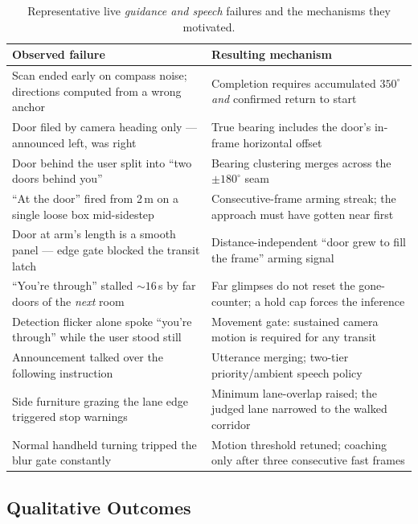 \begin{table}[!htbp]
\centering
\caption[Live guidance and speech failures]{Representative live \emph{guidance and
speech} failures and the mechanisms they motivated.}
\label{tab:failures_guidance}
\small
\begin{tabular}{p{5.8cm} p{7.4cm}}
\toprule
\textbf{Observed failure} & \textbf{Resulting mechanism} \\
\midrule
Scan ended early on compass noise; directions computed from a wrong anchor &
Completion requires accumulated $350^\circ$ \emph{and} confirmed return to start \\
Door filed by camera heading only --- announced left, was right &
True bearing includes the door's in-frame horizontal offset \\
Door behind the user split into ``two doors behind you'' &
Bearing clustering merges across the $\pm180^\circ$ seam \\
``At the door'' fired from 2\,m on a single loose box mid-sidestep &
Consecutive-frame arming streak; the approach must have gotten near first \\
Door at arm's length is a smooth panel --- edge gate blocked the transit latch &
Distance-independent ``door grew to fill the frame'' arming signal \\
``You're through'' stalled ${\sim}16$\,s by far doors of the \emph{next} room &
Far glimpses do not reset the gone-counter; a hold cap forces the inference \\
Detection flicker alone spoke ``you're through'' while the user stood still &
Movement gate: sustained camera motion is required for any transit \\
Announcement talked over the following instruction &
Utterance merging; two-tier priority/ambient speech policy \\
Side furniture grazing the lane edge triggered stop warnings &
Minimum lane-overlap raised; the judged lane narrowed to the walked corridor \\
Normal handheld turning tripped the blur gate constantly &
Motion threshold retuned; coaching only after three consecutive fast frames \\
\bottomrule
\end{tabular}
\end{table}

\subsection{Qualitative Outcomes}

